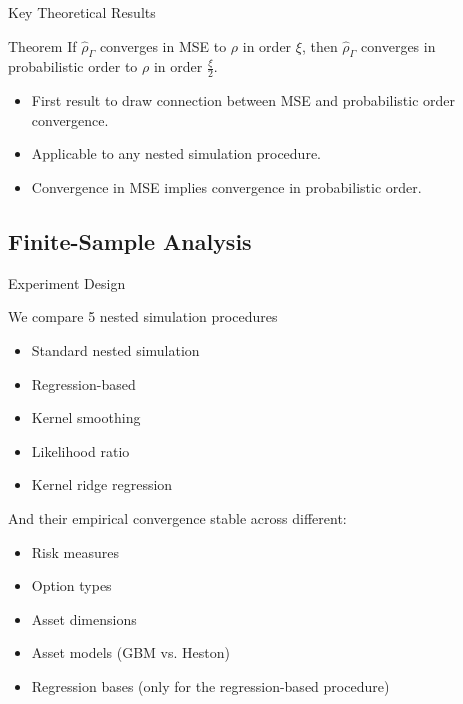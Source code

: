 \documentclass[9pt,handout]{beamer}
\begin{document}
\begin{frame}{Key Theoretical Results}

\begin{block}{Theorem}
    If $\hat{\rho}_{\Gamma}$ converges in MSE to $\rho$ in order $\xi$, then $\hat{\rho}_{\Gamma}$ converges in probabilistic order to $\rho$ in order $\frac{\xi}{2}$.
\end{block}

\begin{itemize}
    \item First result to draw connection between MSE and probabilistic order convergence.
    \item Applicable to any nested simulation procedure.
    \item Convergence in MSE implies convergence in probabilistic order.
\end{itemize}

\end{frame}

\subsection{Finite-Sample Analysis}

\begin{frame}{Experiment Design}

We compare 5 nested simulation procedures 
\begin{itemize}
    \item Standard nested simulation
    \item Regression-based
    \item Kernel smoothing
    \item Likelihood ratio
    \item Kernel ridge regression
\end{itemize}

And their empirical convergence stable across different:
\begin{itemize}
    \item Risk measures
    \item Option types
    \item Asset dimensions
    \item Asset models (GBM vs. Heston)
    \item Regression bases (only for the regression-based procedure)
\end{itemize}

\end{frame}
\end{document}
